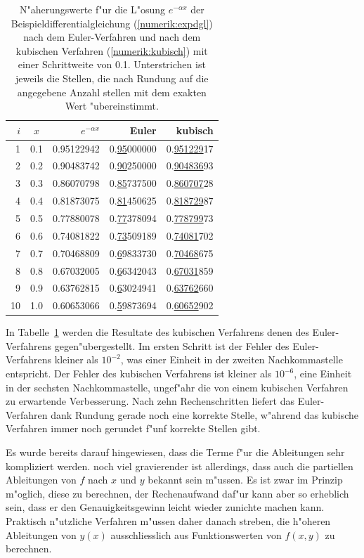 \begin{table}
\centering
\begin{tabular}{|r|c|r|r|r|}
\hline
$i$&$x$&$e^{-\alpha x}$&Euler&kubisch\\
\hline
 1 & 0.1 & 0.95122942 & 0.\underline{95}000000 & 0.\underline{951229}17 \\
 2 & 0.2 & 0.90483742 & 0.\underline{90}250000 & 0.\underline{904836}93 \\
 3 & 0.3 & 0.86070798 & 0.\underline{85}737500 & 0.\underline{860707}28 \\
 4 & 0.4 & 0.81873075 & 0.\underline{81}450625 & 0.\underline{818729}87 \\
 5 & 0.5 & 0.77880078 & 0.\underline{77}378094 & 0.\underline{778799}73 \\
 6 & 0.6 & 0.74081822 & 0.\underline{73}509189 & 0.\underline{74081}702 \\
 7 & 0.7 & 0.70468809 & 0.\underline{6}9833730 & 0.\underline{70468}675 \\
 8 & 0.8 & 0.67032005 & 0.\underline{6}6342043 & 0.\underline{67031}859 \\
 9 & 0.9 & 0.63762815 & 0.\underline{6}3024941 & 0.\underline{63762}660 \\
10 & 1.0 & 0.60653066 & 0.\underline{5}9873694 & 0.\underline{60652}902 \\
\hline
\end{tabular}
\caption{N"aherungswerte f"ur die L"osung $e^{-\alpha x}$ der
Beispieldifferentialgleichung (\ref{numerik:expdgl}) nach dem Euler-Verfahren
und nach dem kubischen Verfahren (\ref{numerik:kubisch}) mit einer
Schrittweite von 0.1. Unterstrichen ist jeweils die Stellen, die nach
Rundung auf die angegebene Anzahl stellen mit dem exakten Wert "ubereinstimmt.
\label{numerik:euler-kubisch}}
\end{table}%
In Tabelle~\ref{numerik:euler-kubisch} werden die Resultate des
kubischen Verfahrens denen des Euler-Verfahrens gegen"ubergestellt.
Im ersten Schritt ist der Fehler des Euler-Verfahrens kleiner als $10^{-2}$,
was einer Einheit in der zweiten Nachkommastelle entspricht.
Der Fehler des kubischen Verfahrens ist kleiner als $10^{-6}$, eine
Einheit in der sechsten Nachkommastelle, ungef"ahr die von einem
kubischen Verfahren zu erwartende Verbesserung.
Nach zehn Rechenschritten liefert das Euler-Verfahren dank Rundung
gerade noch eine korrekte Stelle, w"ahrend das kubische Verfahren immer noch
gerundet f"unf korrekte Stellen gibt.

Es wurde bereits darauf hingewiesen, dass die Terme f"ur die Ableitungen
sehr kompliziert werden.
noch viel gravierender ist allerdings, dass auch die partiellen Ableitungen
von $f$ nach $x$ und $y$ bekannt sein m"ussen.
Es ist zwar im Prinzip m"oglich, diese zu berechnen, der Rechenaufwand 
daf"ur kann aber so erheblich sein, dass er den Genauigkeitsgewinn
leicht wieder zunichte machen kann.
Praktisch n"utzliche Verfahren m"ussen daher danach streben,
die h"oheren Ableitungen von $y(x)$ ausschliesslich aus Funktionswerten
von $f(x,y)$ zu berechnen.

